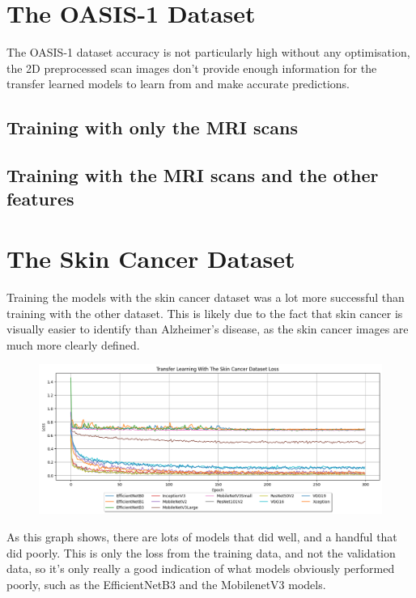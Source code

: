 \documentclass[]{final_report}
\begin{document}
\section{The OASIS-1 Dataset}

The OASIS-1 dataset accuracy is not particularly high without any optimisation, the 2D preprocessed scan images don't provide enough information for the transfer learned models to learn from and make accurate predictions.

\subsection{Training with only the MRI scans}

\subsection{Training with the MRI scans and the other features}

\pagebreak
\section{The Skin Cancer Dataset}
Training the models with the skin cancer dataset was a lot more successful than training with the other dataset. This is likely due to the fact that skin cancer is visually easier to identify than Alzheimer's disease, as the skin cancer images are much more clearly defined.

\begin{figure}[ht!]
  \centering
  \includegraphics[width=1.1\textwidth]{images/skin-cancer-loss.png}
\end{figure}

As this graph shows, there are lots of models that did well, and a handful that did poorly. This is only the loss from the training data, and not the validation data, so it's only really a good indication of what models obviously performed poorly, such as the EfficientNetB3 and the MobilenetV3 models.
\end{document}
